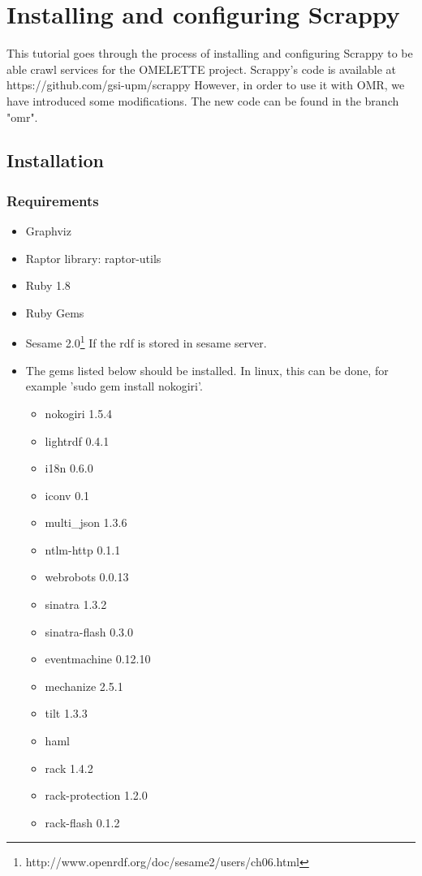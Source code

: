\cleardoublepage
\chapter{Installing and configuring Scrappy}
\label{apdx:installscrappy}

This tutorial goes through the process of installing and configuring Scrappy to be able crawl services for the OMELETTE project.
Scrappy's code is available at https://github.com/gsi-upm/scrappy However, in order to use it with OMR, we have introduced some modifications. The new code can be found in the branch "omr".


\section{Installation}
\subsection{Requirements}
\begin{itemize}
	\item Graphviz
	\item Raptor library: raptor-utils
	\item Ruby 1.8
	\item Ruby Gems
	\item Sesame 2.0\footnote{http://www.openrdf.org/doc/sesame2/users/ch06.html} If the rdf is stored in sesame server.
	\item The gems listed below should be installed. In linux, this can be done, for example 'sudo gem install nokogiri'.
	\begin{itemize}
		\item nokogiri 1.5.4
		\item lightrdf 0.4.1
		\item i18n 0.6.0
		\item iconv 0.1
		\item multi\_json 1.3.6
		\item ntlm-http 0.1.1
		\item webrobots 0.0.13
		\item sinatra 1.3.2
		\item sinatra-flash 0.3.0
		\item eventmachine 0.12.10
		\item mechanize 2.5.1
		\item tilt 1.3.3
		\item haml
		\item rack 1.4.2
		\item rack-protection 1.2.0
		\item rack-flash 0.1.2
	\end{itemize}
\end{itemize}

